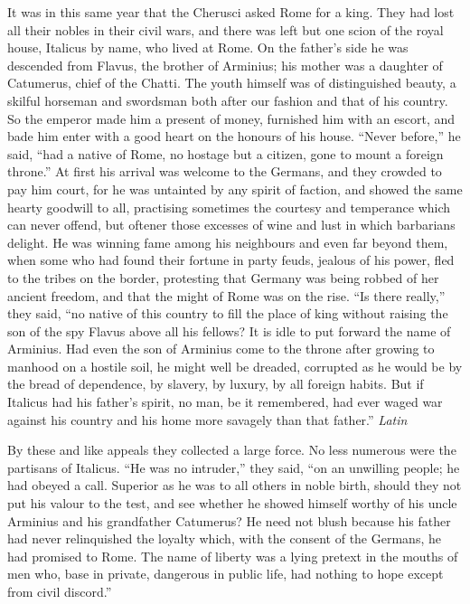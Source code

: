 
It was in this same year that the Cherusci asked Rome for a king. They had lost all their nobles in their civil wars, and there was left but one scion of the royal house, Italicus by name, who lived at Rome. On the father's side he was descended from Flavus, the brother of Arminius; his mother was a daughter of Catumerus, chief of the Chatti. The youth himself was of distinguished beauty, a skilful horseman and swordsman both after our fashion and that of his country. So the emperor made him a present of money, furnished him with an escort, and bade him enter with a good heart on the honours of his house. ``Never before,'' he said, ``had a native of Rome, no hostage but a citizen, gone to mount a foreign throne.'' At first his arrival was welcome to the Germans, and they crowded to pay him court, for he was untainted by any spirit of faction, and showed the same hearty goodwill to all, practising sometimes the courtesy and temperance which can never offend, but oftener those excesses of wine and lust in which barbarians delight. He was winning fame among his neighbours and even far beyond them, when some who had found their fortune in party feuds, jealous of his power, fled to the tribes on the border, protesting that Germany was being robbed of her ancient freedom, and that the might of Rome was on the rise. ``Is there really,'' they said, ``no native of this country to fill the place of king without raising the son of the spy Flavus above all his fellows? It is idle to put forward the name of Arminius. Had even the son of Arminius come to the throne after growing to manhood on a hostile soil, he might well be dreaded, corrupted as he would be by the bread of dependence, by slavery, by luxury, by all foreign habits. But if Italicus had his father's spirit, no man, be it remembered, had ever waged war against his country and his home more savagely than that father.'' \emph{Latin}


By these and like appeals they collected a large force. No less numerous were the partisans of Italicus. ``He was no intruder,'' they said, ``on an unwilling people; he had obeyed a call. Superior as he was to all others in noble birth, should they not put his valour to the test, and see whether he showed himself worthy of his uncle Arminius and his grandfather Catumerus? He need not blush because his father had never relinquished the loyalty which, with the consent of the Germans, he had promised to Rome. The name of liberty was a lying pretext in the mouths of men who, base in private, dangerous in public life, had nothing to hope except from civil discord.''


